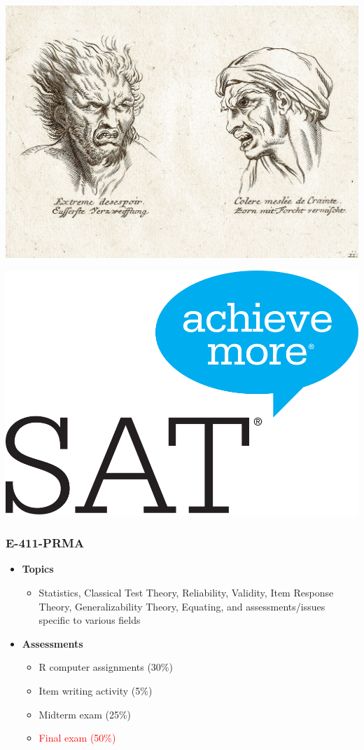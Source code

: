 \documentclass[dvipsnames]{beamer}\usepackage[]{graphicx}\usepackage[]{color}
\begin{document}
\begin{frame}
\centerline{\includegraphics[scale=.15]{images/physiognomy.jpg}}
\end{frame}

\begin{frame}
\centerline{\includegraphics[scale=.2]{images/sat.png}}
\end{frame}

\frame
{
  \frametitle{E-411-PRMA}

\begin{itemize}
  	\item \textbf{Topics}
		\begin{itemize}
			\item Statistics, Classical Test Theory, Reliability, Validity, Item Response Theory, Generalizability Theory, Equating, and assessments/issues specific to various fields
			\end{itemize}
			\item \textbf{Assessments}
			\begin{itemize}
			  \item R computer assignments (30\%)
			  \item Item writing activity (5\%)
			  \item Midterm exam (25\%)
			  \item \textcolor{red}{Final exam (50\%)}
		\end{itemize}  
  \end{itemize}
}
\end{document}
